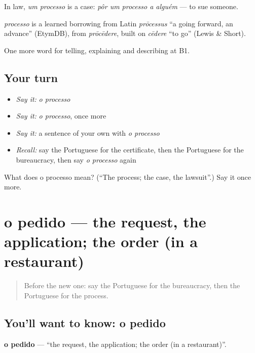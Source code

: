 In law, \emph{um processo} is a case: \emph{pôr um processo a alguém} — to sue someone.

\begin{cousinweb}
\emph{processo} is a learned borrowing from Latin \emph{prōcessus} \textquotedblleft{}a going forward, an advance\textquotedblright{} (EtymDB), from \emph{prōcēdere}, built on \emph{cēdere} \textquotedblleft{}to go\textquotedblright{} (Lewis \& Short).
\end{cousinweb}

\begin{grammarlens}[title={What you've built}]
One more word for telling, explaining and describing at B1.
\end{grammarlens}

\subsection*{Your turn}
\begin{itemize}
\raggedright
  \item \emph{Say it:} \emph{o processo}
  \item \emph{Say it:} \emph{o processo}, once more
  \item \emph{Say it:} a sentence of your own with \emph{o processo}
  \item \emph{Recall:} say the Portuguese for the certificate, then the Portuguese for the bureaucracy, then say \emph{o processo} again
\end{itemize}

\begin{tcolorbox}[breakable,colback=teal!4,colframe=teal!35!black,title={Before you move on}]
What does o processo mean? (\textquotedblleft{}The process; the case, the lawsuit\textquotedblright{}.) Say it once more.
\end{tcolorbox}
\section[o pedido]{o pedido — the request, the application; the order (in a restaurant)}

\label{lesson:PT-C385-pedido}



\begin{quote}
Before the new one: say the Portuguese for the bureaucracy, then the Portuguese for the process.
\end{quote}

\subsection*{You'll want to know: o pedido}
\textbf{o pedido} — \textquotedblleft{}the request, the application; the order (in a restaurant)\textquotedblright{}.

